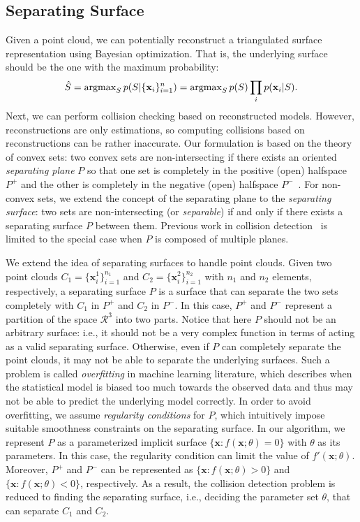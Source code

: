 \subsection{Separating Surface}
\label{sec:7:overview:2}
Given a point cloud, we can potentially reconstruct a triangulated surface representation using Bayesian optimization. That is, the underlying surface should be the one with the maximum probability:
\begin{equation}
\hat{S} = \operatorname{argmax}_S p(S|\{\mathbf x_i\}_{i=1}^n) = \operatorname{argmax}_S p(S) \prod_i p(\mathbf x_i | S).
\end{equation}
Next, we can perform collision checking based on reconstructed models. However, reconstructions are only estimations, so computing collisions based on reconstructions can be rather inaccurate.
Our formulation is based on the theory of convex sets: two convex sets are non-intersecting if there exists an oriented \emph{separating plane} $P$ so that one set is completely in the positive (open) halfspace $P^+$ and the other is completely in the negative (open) halfspace $P^-$~\cite{Mount:2004}. For non-convex sets, we extend the concept of the separating plane to the \emph{separating surface}: two sets are non-intersecting (or \emph{separable}) if and only if there exists a separating surface $P$ between them. Previous work in collision detection~\cite{Mount:2004, Ponamgi:1995} is limited to the special case when $P$ is composed of multiple planes.

We extend the idea of separating surfaces to handle point clouds. Given two point clouds $C_1 = \{\mathbf x_i^1\}_{i=1}^{n_1}$ and $C_2 = \{\mathbf x_i^2\}_{i=1}^{n_2}$
with $n_1$ and $n_2$ elements, respectively, a separating surface $P$ is a surface that can separate the two sets completely with $C_1$ in $P^+$ and $C_2$ in $P^-$.
In this case, $P^+$ and $P^-$ represent a partition of the space $\mathcal{R}^3$ into two parts. Notice that here $P$ should not be an
arbitrary surface: i.e., it should not be a very complex function in terms of acting as a valid separating surface. Otherwise, even if $P$ can completely separate the point clouds, it may not be able to separate the underlying surfaces. Such a problem is called \emph{overfitting} in machine learning literature, which describes when the statistical model is biased too much towards the observed data and thus may not be able to predict the underlying model correctly. In order to avoid overfitting, we assume \emph{regularity conditions} for $P$, which intuitively impose suitable smoothness constraints on the separating surface. In our algorithm, we represent $P$ as a parameterized implicit surface $\{\mathbf x: f(\mathbf x; \theta) = 0\}$ with $\theta$ as its parameters. In this case, the regularity condition can limit the value of $f'(\mathbf x; \theta)$. Moreover, $P^+$ and $P^-$ can be represented as $\{\mathbf x: f(\mathbf x; \theta) > 0\}$ and $\{\mathbf x: f(\mathbf x; \theta) < 0\}$, respectively. As a result, the collision detection problem is reduced to finding the separating surface, i.e., deciding the parameter set $\theta$, that can separate $C_1$ and $C_2$.

